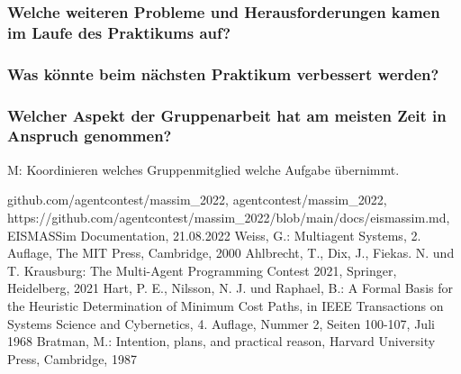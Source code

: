 \documentclass[runningheads]{llncs}
\begin{document}
\subsubsection{Welche weiteren Probleme und Herausforderungen kamen im Laufe des Praktikums auf?\\}
\subsubsection{Was könnte beim nächsten Praktikum verbessert werden?\\}
\subsubsection{Welcher Aspekt der Gruppenarbeit hat am meisten Zeit in Anspruch genommen?\\}
M: Koordinieren welches Gruppenmitglied welche Aufgabe übernimmt.
%
%
%
% 
% 
%
\begin{thebibliography}{8}
	github.com/agentcontest/massim\_2022, agentcontest/massim\_2022, \\ https://github.com/agentcontest/massim\_2022/blob/main/docs/eismassim.md, EISMASSim Documentation, 21.08.2022
	Weiss, G.: Multiagent Systems, 2. Auflage, The MIT Press, Cambridge, 2000
	Ahlbrecht, T., Dix, J., Fiekas. N. und T. Krausburg: The Multi-Agent Programming Contest 2021, Springer, Heidelberg, 2021
	Hart, P. E., Nilsson, N. J. und Raphael, B.: A Formal Basis for the Heuristic Determination of Minimum Cost Paths, in IEEE Transactions on Systems Science and Cybernetics, 4. Auflage, Nummer 2, Seiten 100-107, Juli 1968
	Bratman, M.: Intention, plans, and practical reason, Harvard University Press, Cambridge, 1987
\end{thebibliography}
\end{document}
